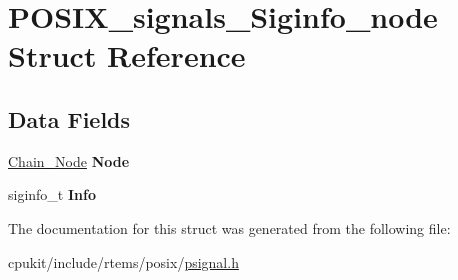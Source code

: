 \hypertarget{structPOSIX__signals__Siginfo__node}{}\section{P\+O\+S\+I\+X\+\_\+signals\+\_\+\+Siginfo\+\_\+node Struct Reference}
\label{structPOSIX__signals__Siginfo__node}
\subsection*{Data Fields}
\begin{DoxyCompactItemize}
\item 
\mbox{\label{structPOSIX__signals__Siginfo__node_aa96785a33d7a66e46cb24bd8aacf1693}} 
\mbox{\hyperlink{group__RTEMSScoreChain_ga0dd4bfcca1ac7f90de2842e447846d3d}{Chain\+\_\+\+Node}} {\bfseries Node}
\item 
\mbox{\label{structPOSIX__signals__Siginfo__node_a4caeaa59db093030e9a77598f57d6763}} 
siginfo\+\_\+t {\bfseries Info}
\end{DoxyCompactItemize}


The documentation for this struct was generated from the following file\+:\begin{DoxyCompactItemize}
\item 
cpukit/include/rtems/posix/\mbox{\hyperlink{psignal_8h}{psignal.\+h}}\end{DoxyCompactItemize}

